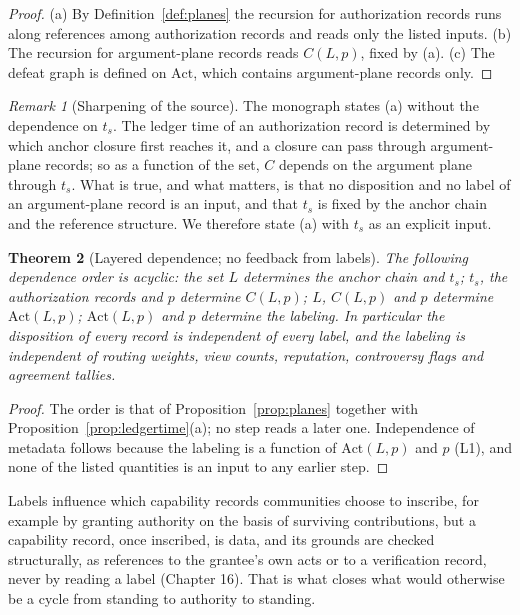 \documentclass[11pt]{article}
\theoremstyle{plain}
\newtheorem{theorem}{Theorem}
\theoremstyle{definition}
\theoremstyle{remark}
\newtheorem{remark}[theorem]{Remark}
\newcommand{\Act}{\mathrm{Act}}
\begin{document}
\begin{proof}
(a) By Definition~\ref{def:planes} the recursion for authorization records runs along references among authorization records and reads only the listed inputs. (b) The recursion for argument-plane records reads $C(L,p)$, fixed by (a). (c) The defeat graph is defined on $\Act$, which contains argument-plane records only.
\end{proof}

\begin{remark}[Sharpening of the source]
The monograph states (a) without the dependence on $t_s$. The ledger time of an authorization record is determined by which anchor closure first reaches it, and a closure can pass through argument-plane records; so as a function of the set, $C$ depends on the argument plane through $t_s$. What is true, and what matters, is that no disposition and no label of an argument-plane record is an input, and that $t_s$ is fixed by the anchor chain and the reference structure. We therefore state (a) with $t_s$ as an explicit input.
\end{remark}

\begin{theorem}[Layered dependence; no feedback from labels]\label{thm:layers}
The following dependence order is acyclic: the set $L$ determines the anchor chain and $t_s$; $t_s$, the authorization records and $p$ determine $C(L,p)$; $L$, $C(L,p)$ and $p$ determine $\Act(L,p)$; $\Act(L,p)$ and $p$ determine the labeling. In particular the disposition of every record is independent of every label, and the labeling is independent of routing weights, view counts, reputation, controversy flags and agreement tallies.
\end{theorem}

\begin{proof}
The order is that of Proposition~\ref{prop:planes} together with Proposition~\ref{prop:ledgertime}(a); no step reads a later one. Independence of metadata follows because the labeling is a function of $\Act(L,p)$ and $p$ (L1), and none of the listed quantities is an input to any earlier step.
\end{proof}

Labels influence which capability records communities choose to inscribe, for example by granting authority on the basis of surviving contributions, but a capability record, once inscribed, is data, and its grounds are checked structurally, as references to the grantee's own acts or to a verification record, never by reading a label (Chapter 16). That is what closes what would otherwise be a cycle from standing to authority to standing.
\end{document}
